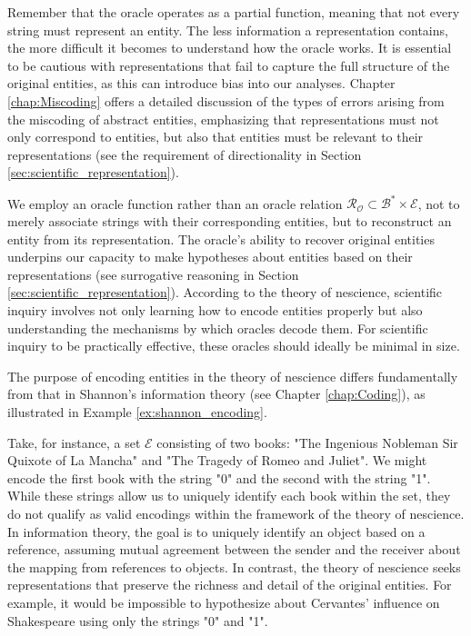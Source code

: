 Remember that the oracle operates as a partial function, meaning that not every string must represent an entity. The less information a representation contains, the more difficult it becomes to understand how the oracle works. It is essential to be cautious with representations that fail to capture the full structure of the original entities, as this can introduce bias into our analyses. Chapter \ref{chap:Miscoding} offers a detailed discussion of the types of errors arising from the miscoding of abstract entities, emphasizing that representations must not only correspond to entities, but also that entities must be relevant to their representations (see the requirement of directionality in Section \ref{sec:scientific_representation}).

We employ an oracle function rather than an oracle relation $\mathcal{R}_\mathcal{O} \subset \mathcal{B}^\ast \times \mathcal{E}$, not to merely associate strings with their corresponding entities, but to reconstruct an entity from its representation. The oracle's ability to recover original entities underpins our capacity to make hypotheses about entities based on their representations (see surrogative reasoning in Section \ref{sec:scientific_representation}). According to the theory of nescience, scientific inquiry involves not only learning how to encode entities properly but also understanding the mechanisms by which oracles decode them. For scientific inquiry to be practically effective, these oracles should ideally be minimal in size.

The purpose of encoding entities in the theory of nescience differs fundamentally from that in Shannon's information theory (see Chapter \ref{chap:Coding}), as illustrated in Example \ref{ex:shannon_encoding}.

\begin{example}
\label{ex:shannon_encoding}
Take, for instance, a set $\mathcal{E}$ consisting of two books: "The Ingenious Nobleman Sir Quixote of La Mancha" and "The Tragedy of Romeo and Juliet". We might encode the first book with the string "0" and the second with the string "1". While these strings allow us to uniquely identify each book within the set, they do not qualify as valid encodings within the framework of the theory of nescience. In information theory, the goal is to uniquely identify an object based on a reference, assuming mutual agreement between the sender and the receiver about the mapping from references to objects. In contrast, the theory of nescience seeks representations that preserve the richness and detail of the original entities. For example, it would be impossible to hypothesize about Cervantes' influence on Shakespeare using only the strings "0" and "1".
\end{example}

